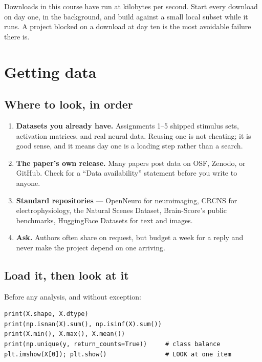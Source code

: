 \documentclass[11pt]{article}
\begin{document}
\begin{keybox}
 Downloads in this course have run at
kilobytes per second. Start every download on day one, in the background, and
build against a small local subset while it runs. A project blocked on a
download at day ten is the most avoidable failure there is.
\end{keybox}

\section{Getting data}

\subsection{Where to look, in order}

\begin{enumerate}
  \item \textbf{Datasets you already have.} Assignments 1--5 shipped stimulus
        sets, activation matrices, and real neural data. Reusing one is not
        cheating; it is good sense, and it means day one is a loading step
        rather than a search.
  \item \textbf{The paper's own release.} Many papers post data on OSF, Zenodo,
        or GitHub. Check for a ``Data availability'' statement before you write
        to anyone.
  \item \textbf{Standard repositories} --- OpenNeuro for neuroimaging, CRCNS for
        electrophysiology, the Natural Scenes Dataset, Brain-Score's public
        benchmarks, HuggingFace Datasets for text and images.
  \item \textbf{Ask.} Authors often share on request, but budget a week for a
        reply and never make the project depend on one arriving.
\end{enumerate}

\subsection{Load it, then look at it}

Before any analysis, and without exception:

\begin{lstlisting}
print(X.shape, X.dtype)
print(np.isnan(X).sum(), np.isinf(X).sum())
print(X.min(), X.max(), X.mean())
print(np.unique(y, return_counts=True))     # class balance
plt.imshow(X[0]); plt.show()                # LOOK at one item
\end{lstlisting}
\end{document}
